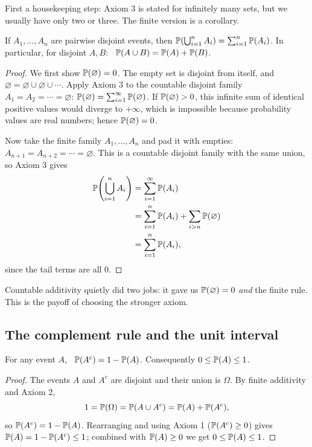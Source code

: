 First a housekeeping step: Axiom 3 is stated for infinitely many sets, but we
usually have only two or three. The finite version is a corollary.

\begin{proposition}
\label{ch03:prop-finite-add}
If $A_1, \dots, A_n$ are pairwise disjoint events, then
$\P\!\left(\bigcup_{i=1}^{n} A_i\right) = \sum_{i=1}^{n} \P(A_i)$. In particular,
for disjoint $A, B$: \ $\P(A \cup B) = \P(A) + \P(B)$.
\end{proposition}

\begin{proof}
We first show $\P(\varnothing) = 0$. The empty set is disjoint from itself, and
$\varnothing = \varnothing \cup \varnothing \cup \cdots$. Apply Axiom 3 to the
countable disjoint family $A_1 = A_2 = \cdots = \varnothing$:
$\P(\varnothing) = \sum_{i=1}^\infty \P(\varnothing)$. If $\P(\varnothing) > 0$,
this infinite sum of identical positive values would diverge to $+\infty$, which
is impossible because probability values are real numbers; hence
$\P(\varnothing) = 0$.

Now take the finite family $A_1, \dots, A_n$ and pad it with empties:
$A_{n+1} = A_{n+2} = \cdots = \varnothing$. This is a countable disjoint family
with the same union, so Axiom 3 gives
\begin{align*}
\P\!\left(\bigcup_{i=1}^{n} A_i\right)
&= \sum_{i=1}^{\infty} \P(A_i) \\
&= \sum_{i=1}^{n} \P(A_i) + \sum_{i>n} \P(\varnothing) \\
&= \sum_{i=1}^{n} \P(A_i),
\end{align*}
since the tail terms are all $0$.
\end{proof}

Countable additivity quietly did two jobs: it gave us
$\P(\varnothing)=0$ \emph{and} the finite rule. This is the payoff of choosing the
stronger axiom.

\subsection{The complement rule and the unit interval}
\label{ch03:complement}

\begin{proposition}
\label{ch03:prop-complement}
For any event $A$, \ $\P(A^c) = 1 - \P(A)$. Consequently $0 \le \P(A) \le 1$.
\end{proposition}

\begin{proof}
The events $A$ and $A^c$ are disjoint and their union is $\Omega$. By finite
additivity and Axiom 2,
\[
1 = \P(\Omega) = \P(A \cup A^c) = \P(A) + \P(A^c),
\]
so $\P(A^c) = 1 - \P(A)$. Rearranging and using Axiom 1 ($\P(A^c) \ge 0$) gives
$\P(A) = 1 - \P(A^c) \le 1$; combined with $\P(A) \ge 0$ we get
$0 \le \P(A) \le 1$.
\end{proof}

